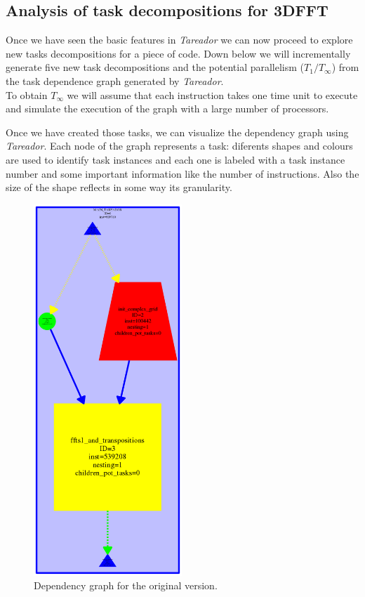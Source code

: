 \documentclass[12]{article}
\begin{document}
\subsection{Analysis of task decompositions for 3DFFT}

Once we have seen the basic features in \textit{Tareador} we can now proceed to explore new tasks decompositions for a piece of code. Down below we will incrementally generate five new task decompositions and the potential parallelism ($T_1 / T_\infty$) from the task dependence graph generated by \textit{Tareador}. 
\\
To obtain $T_\infty$ we will assume that each instruction takes one time unit to execute and simulate the execution of the graph with a large number of processors.

Once we have created those tasks, we can visualize the dependency graph using \textit{Tareador}. Each node of the graph represents a task: diferents shapes and colours are used to identify task instances and each one is labeled with a task instance number and some important information like the number of instructions. Also the size of the shape reflects in some way its granularity.

\begin{figure}[H]
\centering  \includegraphics[width=.8\linewidth, height=14cm, width=6cm]{images/dependency_graph0.png}
  \caption{Dependency graph for the original version.}
  \label{fig:Depencency0}
\centering
\end{figure}
\end{document}
